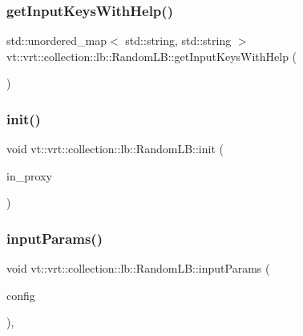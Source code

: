 \subsubsection{\texorpdfstring{get\+Input\+Keys\+With\+Help()}{getInputKeysWithHelp()}}
{\footnotesize\ttfamily std\+::unordered\+\_\+map$<$ std\+::string, std\+::string $>$ vt\+::vrt\+::collection\+::lb\+::\+Random\+L\+B\+::get\+Input\+Keys\+With\+Help (\begin{DoxyParamCaption}{ }\end{DoxyParamCaption})\hspace{0.3cm}{\ttfamily [static]}}

\mbox{\label{structvt_1_1vrt_1_1collection_1_1lb_1_1_random_l_b_a1b9a24043e9a971fc3acb47233028ca8}} 
\subsubsection{\texorpdfstring{init()}{init()}}
{\footnotesize\ttfamily void vt\+::vrt\+::collection\+::lb\+::\+Random\+L\+B\+::init (\begin{DoxyParamCaption}\item[{\hyperlink{structvt_1_1objgroup_1_1proxy_1_1_proxy}{objgroup\+::proxy\+::\+Proxy}$<$ \hyperlink{structvt_1_1vrt_1_1collection_1_1lb_1_1_random_l_b}{Random\+LB} $>$}]{in\+\_\+proxy }\end{DoxyParamCaption})}

\mbox{\label{structvt_1_1vrt_1_1collection_1_1lb_1_1_random_l_b_a19a7f9317660253f4fd7f3883c2e4e96}} 
\subsubsection{\texorpdfstring{input\+Params()}{inputParams()}}
{\footnotesize\ttfamily void vt\+::vrt\+::collection\+::lb\+::\+Random\+L\+B\+::input\+Params (\begin{DoxyParamCaption}\item[{\hyperlink{structvt_1_1vrt_1_1collection_1_1balance_1_1_config_entry}{balance\+::\+Config\+Entry} $\ast$}]{config }\end{DoxyParamCaption})\hspace{0.3cm}{\ttfamily [override]}, {\ttfamily [virtual]}}



